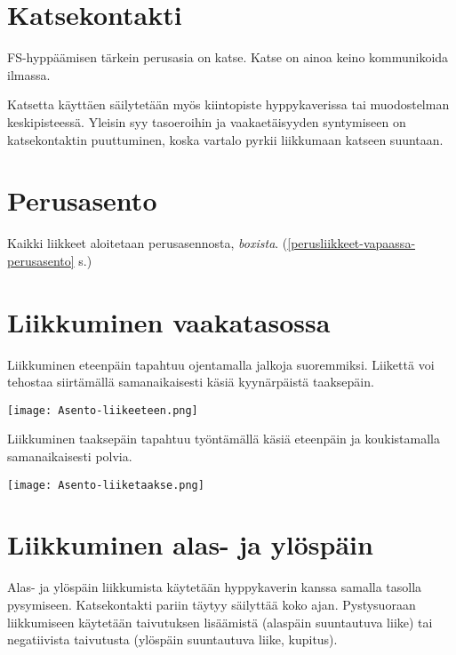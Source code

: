 \section{ Katsekontakti }
\label{fs-kuviohyppaaminen-katsekontakti}


FS-hyppäämisen tärkein perusasia on katse. Katse on ainoa keino kommunikoida ilmassa. 


Katsetta käyttäen säilytetään myös kiintopiste hyppykaverissa tai muodostelman keskipisteessä. Yleisin syy tasoeroihin ja vaakaetäisyyden syntymiseen on katsekontaktin puuttuminen, koska vartalo pyrkii liikkumaan katseen suuntaan. 

\section{ Perusasento  }
\label{fs-kuviohyppaaminen-perusasento}


Kaikki liikkeet aloitetaan perusasennosta, \textit{boxista}. (\ref{perusliikkeet-vapaassa-perusasento} s.\pageref{perusliikkeet-vapaassa-perusasento}) 

\section{ Liikkuminen vaakatasossa }
\label{fs-kuviohyppaaminen-liikkuminen-vaakatasossa}


Liikkuminen eteenpäin tapahtuu ojentamalla jalkoja suoremmiksi. Liikettä voi tehostaa siirtämällä samanaikaisesti käsiä kyynärpäistä taaksepäin. 


\begin{Figure}\centering\texttt{[image: Asento-liikeeteen.png]}\end{Figure} 


Liikkuminen taaksepäin tapahtuu työntämällä käsiä eteenpäin ja koukistamalla samanaikaisesti polvia. 


\begin{Figure}\centering\texttt{[image: Asento-liiketaakse.png]}\end{Figure} 

\section{ Liikkuminen alas- ja ylöspäin }
\label{fs-kuviohyppaaminen-liikkuminen-alas-ja-ylospain}


Alas- ja ylöspäin liikkumista käytetään hyppykaverin kanssa samalla tasolla pysymiseen. Katsekontakti pariin täytyy säilyttää koko ajan. Pystysuoraan liikkumiseen käytetään taivutuksen lisäämistä (alaspäin suuntautuva liike) tai negatiivista taivutusta (ylöspäin suuntautuva liike, kupitus). 


